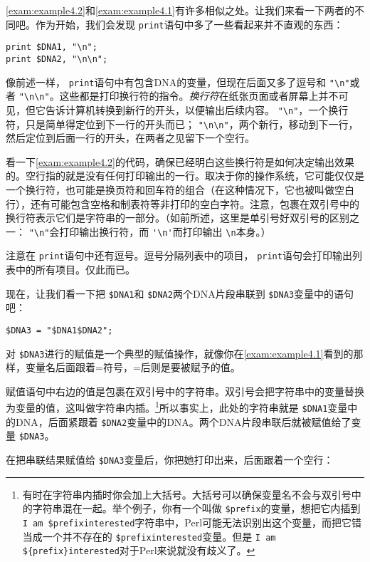 \autoref{exam:example4.2}和\autoref{exam:example4.1}有许多相似之处。让我们来看一下两者的不同吧。作为开始，我们会发现 \verb|print|语句中多了一些看起来并不直观的东西：

\begin{lstlisting}
print $DNA1, "\n";
print $DNA2, "\n\n";
\end{lstlisting}

像前述一样， \verb|print|语句中有包含DNA的变量，但现在后面又多了逗号和 \verb|"\n"|或者 \verb|"\n\n"|。这些都是打印换行符的指令。\textit{换行符}在纸张页面或者屏幕上并不可见，但它告诉计算机转换到新行的开头，以便输出后续内容。 \verb|"\n"|，一个换行符，只是简单得定位到下一行的开头而已； \verb|"\n\n"|，两个新行，移动到下一行，然后定位到后面一行的开头，在两者之见留下一个空行。

看一下\autoref{exam:example4.2}的代码，确保已经明白这些换行符是如何决定输出效果的。空行指的就是没有任何打印输出的一行。取决于你的操作系统，它可能仅仅是一个换行符，也可能是换页符和回车符的组合（在这种情况下，它也被叫做空白行），还有可能包含空格和制表符等非打印的空白字符。注意，包裹在双引号中的换行符表示它们是字符串的一部分。（如前所述，这里是单引号好双引号的区别之一： \verb|"\n"|会打印输出换行符，而 \verb|'\n'|而打印输出 \verb|\n|本身。）

注意在 \verb|print|语句中还有逗号。逗号分隔列表中的项目， \verb|print|语句会打印输出列表中的所有项目。仅此而已。

现在，让我们看一下把 \verb|$DNA1|和 \verb|$DNA2|两个DNA片段串联到 \verb|$DNA3|变量中的语句吧：

\begin{lstlisting}
$DNA3 = "$DNA1$DNA2"; 
\end{lstlisting}

对 \verb|$DNA3|进行的赋值是一个典型的赋值操作，就像你在\autoref{exam:example4.1}看到的那样，变量名后面跟着=符号，=后则是要被赋予的值。

赋值语句中右边的值是包裹在双引号中的字符串。双引号会把字符串中的变量替换为变量的值，这叫做字符串内插。\footnote{有时在字符串内插时你会加上大括号。大括号可以确保变量名不会与双引号中的字符串混在一起。举个例子，你有一个叫做 \verb|$prefix|的变量，想把它内插到 \verb|I am $prefixinterested|字符串中，Perl可能无法识别出这个变量，而把它错当成一个并不存在的 \verb|$prefixinterested|变量。但是 \verb|I am ${prefix}interested|对于Perl来说就没有歧义了。}所以事实上，此处的字符串就是 \verb|$DNA1|变量中的DNA，后面紧跟着 \verb|$DNA2|变量中的DNA。两个DNA片段串联后就被赋值给了变量 \verb|$DNA3|。

在把串联结果赋值给 \verb|$DNA3|变量后，你把她打印出来，后面跟着一个空行：

